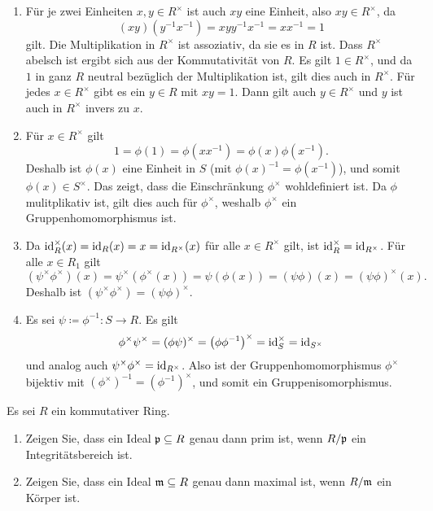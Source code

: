 \begin{solution}
  \begin{enumerate}
    \item
      Für je zwei Einheiten $x, y \in R^\times$ ist auch $xy$ eine Einheit, also $xy \in R^\times$, da
      \[
          (xy)(y^{-1}x^{-1})
        = x y y^{-1} x^{-1}
        = x x^{-1}
        = 1
      \]
      gilt.
      Die Multiplikation in $R^\times$ ist assoziativ, da sie es in $R$ ist.
      Dass $R^\times$ abelsch ist ergibt sich aus der Kommutativität von $R$.
      Es gilt $1 \in R^\times$, und da $1$ in ganz $R$ neutral bezüglich der Multiplikation ist, gilt dies auch in $R^\times$.
      Für jedes $x \in R^\times$ gibt es ein $y \in R$ mit $xy = 1$.
      Dann gilt auch $y \in R^\times$ und $y$ ist auch in $R^\times$ invers zu $x$.
    \item
      Für $x \in R^\times$ gilt
      \[
          1
        = \phi(1)
        = \phi(x x^{-1})
        = \phi(x) \phi(x^{-1}).
      \]
      Deshalb ist $\phi(x)$ eine Einheit in $S$ (mit $\phi(x)^{-1} = \phi(x^{-1})$), und somit $\phi(x) \in S^\times$.
      Das zeigt, dass die Einschränkung $\phi^\times$ wohldefiniert ist.
      Da $\phi$ mulitplikativ ist, gilt dies auch für $\phi^\times$, weshalb $\phi^\times$ ein Gruppenhomomorphismus ist.
    \item
      Da $\operatorname{id}_R^\times(x) = \operatorname{id}_R(x) = x = \operatorname{id}_{R^\times}(x)$ für alle $x \in R^\times$ gilt, ist $\operatorname{id}_R^\times = \operatorname{id}_{R^\times}$.
      Für alle $x \in R_1$ gilt
      \[
          (\psi^\times \phi^\times)(x)
        = \psi^\times(\phi^\times(x))
        = \psi(\phi(x))
        = (\psi \phi)(x)
        = (\psi \phi)^\times(x).
      \]
      Deshalb ist $(\psi^\times \phi^\times) = (\psi \phi)^\times$.
    \item
      Es sei $\psi \coloneqq \phi^{-1} \colon S \to R$.
      Es gilt
      \[
          \phi^\times \psi^\times
        = (\phi \psi)^\times
        = \left( \phi \phi^{-1} \right)^\times
        = \operatorname{id}_S^\times
        = \operatorname{id}_{S^\times}
      \]
      und analog auch $\psi^\times \phi^\times = \operatorname{id}_{R^\times}$.
      Also ist der Gruppenhomomorphismus $\phi^\times$ bijektiv mit $(\phi^\times)^{-1} = (\phi^{-1})^\times$, und somit ein Gruppenisomorphismus.
  \end{enumerate}
\end{solution}


\begin{question}[subtitle = Charakterisierung on Primidealen und maximalen Idealen durch ihre Quotienten]
  Es sei $R$ ein kommutativer Ring.
  \begin{enumerate}
    \item
      Zeigen Sie, dass ein Ideal $\mathfrak{p} \subseteq R$ genau dann prim ist, wenn $R/\mathfrak{p}$ ein Integritätsbereich ist.
    \item
      Zeigen Sie, dass ein Ideal $\mathfrak{m} \subseteq R$ genau dann maximal ist, wenn $R/\mathfrak{m}$ ein Körper ist. 
  \end{enumerate}
\end{question}


